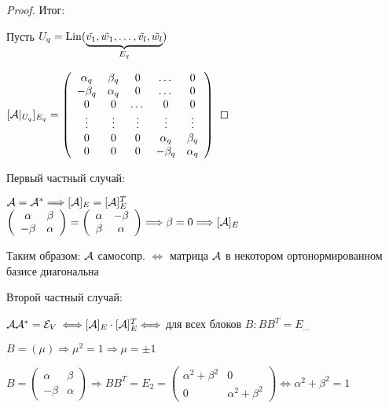 \begin{theorem}
\begin{proof}
    Итог: 

    Пусть $U_q = \operatorname{Lin} (\underbrace{\tilde{v_1}, \tilde{w_1}, \dots, \tilde{v_l}, \tilde{w_l}}_{\text{$ E_q $}} )$
    
    $[\mathcal{A} |_{U_q}]_{E_q} = \left(\begin{array}{ccccc}
    \alpha_q & \beta_q & 0 & \dots & 0 \\ 
    -\beta_q & \alpha_q & 0 & \dots & 0 \\ 
    0 & 0 & \dots & 0 & 0 \\ 
    \vdots & \vdots & \vdots & \vdots & \vdots \\
    0 & 0 & 0 & \alpha_q & \beta_q \\ 
    0 & 0 & 0 & -\beta_q & \alpha_q
    \end{array}\right)$
\end{proof} 
\end{theorem}


\notice

Первый частный случай:

    $\mathcal{A} = \mathcal{A}^* \Longrightarrow [\mathcal{A}]_{E} = [\mathcal{A}]^T_{E}$ \\
    $\left(\begin{array}{cc}
    \alpha & \beta \\ 
    -\beta & \alpha
    \end{array}\right) = \left(\begin{array}{cc}
    \alpha & -\beta \\ 
    \beta & \alpha
    \end{array}\right) \Longrightarrow \beta = 0 \Longrightarrow [\mathcal{A}]_{E}$

    Таким образом: $\mathcal{A}$ самосопр. $\Longleftrightarrow$ матрица $\mathcal{A}$ в некотором ортонормированном базисе диагональна

Второй частный случай:

    $\mathcal{A} \mathcal{A}^* = \mathcal{E}_V$
    $\Longleftrightarrow [\mathcal{A}]_{E} \cdot [\mathcal{A}]^T_{E} \Longleftrightarrow $ для всех блоков $B: BB^T = E_{\dots}$

    $B = (\mu) \Longrightarrow \mu^2 = 1 \Longrightarrow \mu = \pm 1$

    $B = \left(\begin{array}{cc}
    \alpha & \beta \\ 
    -\beta & \alpha
    \end{array}\right) \Longrightarrow BB^T = E_2 = \left(\begin{array}{cc}
    \alpha^2 + \beta^2 & 0 \\ 
    0 & \alpha^2 + \beta^2
    \end{array}\right) \Longleftrightarrow \alpha^2 + \beta^2 = 1$

